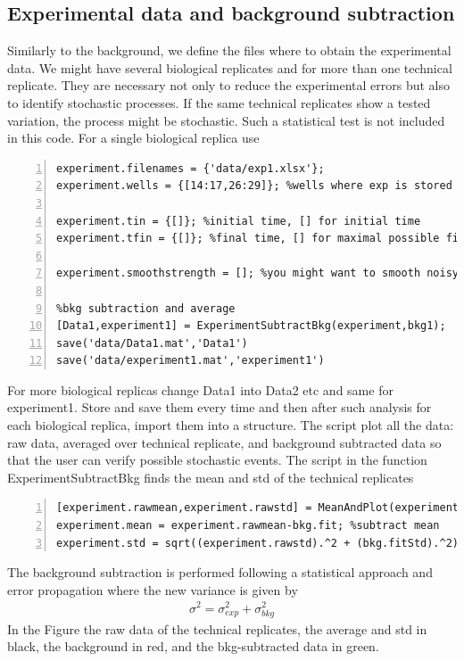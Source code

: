 \documentclass{article}
\begin{document}
\subsection{Experimental data and background subtraction}
Similarly to the background, we define the files where to obtain the experimental data. We might have several biological replicates and for more than one technical replicate. They are necessary not only to reduce the experimental errors but also to identify stochastic processes. If the same technical replicates show a tested variation, the process might be stochastic. Such a statistical test is not included in this code. For a single biological replica use
\begin{lstlisting}[frame=single,numbers=left,style=Matlab-Pyglike]
experiment.filenames = {'data/exp1.xlsx'};
experiment.wells = {[14:17,26:29]}; %wells where exp is stored

experiment.tin = {[]}; %initial time, [] for initial time
experiment.tfin = {[]}; %final time, [] for maximal possible final time

experiment.smoothstrength = []; %you might want to smooth noisy data, use a positive number 

%bkg subtraction and average
[Data1,experiment1] = ExperimentSubtractBkg(experiment,bkg1);
save('data/Data1.mat','Data1') 
save('data/experiment1.mat','experiment1')
\end{lstlisting}
For more biological replicas change Data1 into Data2 etc and same for experiment1. Store and save them every time and then after such analysis for each biological replica, import them into a structure. The script plot all the data: raw data, averaged over technical replicate, and background subtracted data so that the user can verify possible stochastic events. The script in the function ExperimentSubtractBkg finds the mean and std of the technical replicates
\begin{lstlisting}[frame=single,numbers=left,style=Matlab-Pyglike]
[experiment.rawmean,experiment.rawstd] = MeanAndPlot(experiment.time{1},expR);
experiment.mean = experiment.rawmean-bkg.fit; %subtract mean
experiment.std = sqrt((experiment.rawstd).^2 + (bkg.fitStd).^2); %find std
\end{lstlisting}
The background subtraction is performed following a statistical approach and error propagation where the new variance is given by
\begin{align}
\sigma^2 = \sigma_{exp}^2 + \sigma_{bkg}^2 
\end{align}
In the Figure the raw data of the technical replicates, the average and std in black, the background in red, and the bkg-subtracted data in green. 
\end{document}
